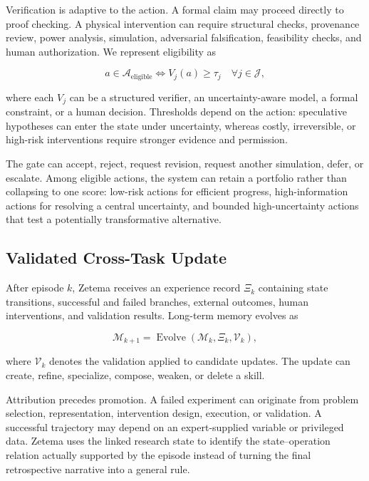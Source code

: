 \documentclass[11pt, a4paper, copyright]{google}
\begin{document}
Verification is adaptive to the action. A formal claim may proceed directly to proof checking. A physical intervention can require structural checks, provenance review, power analysis, simulation, adversarial falsification, feasibility checks, and human authorization. We represent eligibility as

\begin{equation}
a\in\mathcal{A}_{\mathrm{eligible}}
\iff
V_j(a)\geq\tau_j
\quad\forall j\in\mathcal{J},
\label{eq:experimental-gating}
\end{equation}

where each $V_j$ can be a structured verifier, an uncertainty-aware model, a formal constraint, or a human decision. Thresholds depend on the action: speculative hypotheses can enter the state under uncertainty, whereas costly, irreversible, or high-risk interventions require stronger evidence and permission.

The gate can accept, reject, request revision, request another simulation, defer, or escalate. Among eligible actions, the system can retain a portfolio rather than collapsing to one score: low-risk actions for efficient progress, high-information actions for resolving a central uncertainty, and bounded high-uncertainty actions that test a potentially transformative alternative.

\subsection{Validated Cross-Task Update}
\label{subsec:cross-task-improvement}

After episode $k$, Zetema receives an experience record $\Xi_k$ containing state transitions, successful and failed branches, external outcomes, human interventions, and validation results. Long-term memory evolves as

\begin{equation}
\mathcal{M}_{k+1}
=
\operatorname{Evolve}(\mathcal{M}_k,\Xi_k,\mathcal{V}_k),
\label{eq:cross-task-memory-update}
\end{equation}

where $\mathcal{V}_k$ denotes the validation applied to candidate updates. The update can create, refine, specialize, compose, weaken, or delete a skill.

Attribution precedes promotion. A failed experiment can originate from problem selection, representation, intervention design, execution, or validation. A successful trajectory may depend on an expert-supplied variable or privileged data. Zetema uses the linked research state to identify the state--operation relation actually supported by the episode instead of turning the final retrospective narrative into a general rule.
\end{document}
